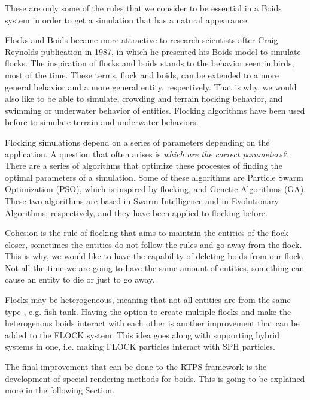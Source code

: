 These are only some of the rules that we consider to be essential in a Boids system in order to get a simulation that has a natural appearance.

Flocks and Boids became more attractive to research scientists after Craig Reynolds publication in 1987\cite{craig1}, in which he presented his Boids model to simulate flocks. The inspiration of flocks and boids stands to the behavior seen in birds, most of the time. These terms, flock and boids, can be extended to a more general behavior and a more general entity, respectively. That is why, we would also like to be able to simulate, crowding and terrain flocking behavior, and swimming or underwater behavior of entities. Flocking algorithms have been used before to simulate terrain and underwater behaviors\cite{supermassiveCrowd}. 

Flocking simulations depend on a series of parameters depending on the application. A question that often arises is \textit{which are the correct parameters?}. There are a series of algorithms that optimize these processes of finding the optimal parameters of a simulation. Some of these algorithms are Particle Swarm Optimization (PSO), which is inspired by flocking, and Genetic Algorithms (GA). These two algorithms are based in Swarm Intelligence and in Evolutionary Algorithms, respectively, and they have been applied to flocking before\cite{TODO:needReference}.

Cohesion is the rule of flocking that aims to maintain the entities of the flock closer, sometimes the entities do not follow the rules and go away from the flock. This is why, we would like to have the capability of deleting boids from our flock. Not all the time we are going to have the same amount of entities, something can cause an entity to die or just to go away.

Flocks may be heterogeneous, meaning that not all entities are from the same type , e.g. fish tank. Having the option to create multiple flocks and make the heterogenous boids interact with each other is another improvement that can be added to the FLOCK system. This idea goes along with supporting hybrid systems in one, i.e. making FLOCK particles interact with SPH particles.

The final improvement that can be done to the RTPS framework is the development of special rendering methods for boids. This is going to be explained more in the following Section.

